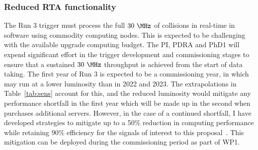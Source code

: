 \documentclass[11pt,a4paper]{article}
\begin{document}
\subsubsection{Reduced RTA functionality}
The Run 3 trigger must process the full $30~\MHz$ of collisions in real-time in software using commodity computing nodes. This is expected to be challenging with the available \LHCb upgrade computing budget. The PI, PDRA and PhD1 will expend significant effort in the trigger development and commissioning stages to ensure that a sustained $30~\MHz$ throughput is achieved from the start of data taking. The first year of Run 3 is expected to be a commissioning year, in which \LHCb may run at a lower luminosity than in 2022 and 2023. The extrapolations in Table~\ref{tab:sens} account for this, and the reduced luminosity would mitigate any performance shortfall in the first year which will be made up in the second when \LHCb purchases additional servers. However, in the case of a continued shortfall, I have developed strategies to mitigate up to a 50\% reduction in computing performance while retaining 90\% efficiency for the signals of interest to this proposal~\cite{Bourgeois:2018nvk}. This mitigation can be deployed during the commissioning period as part of WP1.
\end{document}
